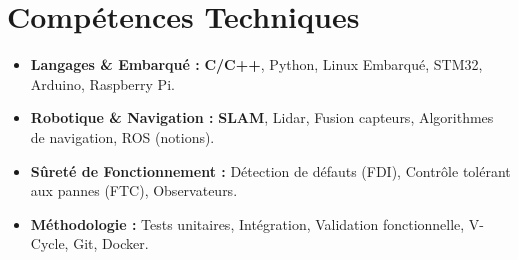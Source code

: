 \documentclass[a4paper,11pt]{article}
\begin{document}
\section{Compétences Techniques}
\begin{itemize}[leftmargin=*, nosep]
    \item \small{\textbf{Langages \& Embarqué :} \textbf{C/C++}, Python, Linux Embarqué, STM32, Arduino, Raspberry Pi.}
    \item \small{\textbf{Robotique \& Navigation :} \textbf{SLAM}, Lidar, Fusion capteurs, Algorithmes de navigation, ROS (notions).}
    \item \small{\textbf{Sûreté de Fonctionnement :} Détection de défauts (FDI), Contrôle tolérant aux pannes (FTC), Observateurs.}
    \item \small{\textbf{Méthodologie :} Tests unitaires, Intégration, Validation fonctionnelle, V-Cycle, Git, Docker.}
\end{itemize}

\end{document}
